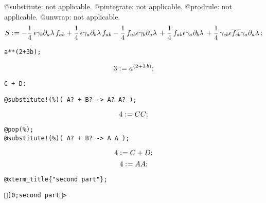 \documentclass[11pt]{article}
\def\specialcolon{\mathrel{\mathop{:}}\hspace{-.5em}}
\renewcommand{\bar}[1]{\overline{#1}}
\begin{document}
@substitute: not applicable.
@pintegrate: not applicable.
@prodrule: not applicable.
@unwrap: not applicable.
\begin{dmath*}[compact, spread=2pt]
S\specialcolon{}=  - \frac{1}{4}\, \epsilon {\gamma}_{b} {\partial}_{a}{\lambda}\,  {f}_{a b} + \frac{1}{4}\, \epsilon {\gamma}_{a} {\partial}_{b}{\lambda}\,  {f}_{a b} - \frac{1}{4}\, {f}_{a b} \epsilon {\gamma}_{b} {\partial}_{a}{\lambda}\,  + \frac{1}{4}\, {f}_{a b} \epsilon {\gamma}_{a} {\partial}_{b}{\lambda}\,  + \frac{1}{4}\, {\gamma}_{c b} \epsilon \bar{{f}_{c b}} {\gamma}_{a} {\partial}_{a}{\lambda}\, ;
\end{dmath*}
{\color[named]{Blue}\begin{verbatim}
a**(2+3b);
\end{verbatim}}
\begin{dmath*}[compact, spread=2pt]
3\specialcolon{}= a{}^{(2 + 3\, b)};
\end{dmath*}
{\color[named]{Blue}\begin{verbatim}
C + D:
\end{verbatim}}
{\color[named]{Blue}\begin{verbatim}
@substitute!(%)( A? + B? -> A? A? );
\end{verbatim}}
\begin{dmath*}[compact, spread=2pt]
4\specialcolon{}= C C;
\end{dmath*}
{\color[named]{Blue}\begin{verbatim}
@pop(%);
@substitute!(%)( A? + B? -> A A );
\end{verbatim}}
\begin{dmath*}[compact, spread=2pt]
4\specialcolon{}= C + D;
\end{dmath*}
\begin{dmath*}[compact, spread=2pt]
4\specialcolon{}= A A;
\end{dmath*}
{\color[named]{Blue}\begin{verbatim}
@xterm_title{"second part"};
\end{verbatim}}
\begin{verbatim}
]0;second part>
\end{verbatim}
\end{document}
